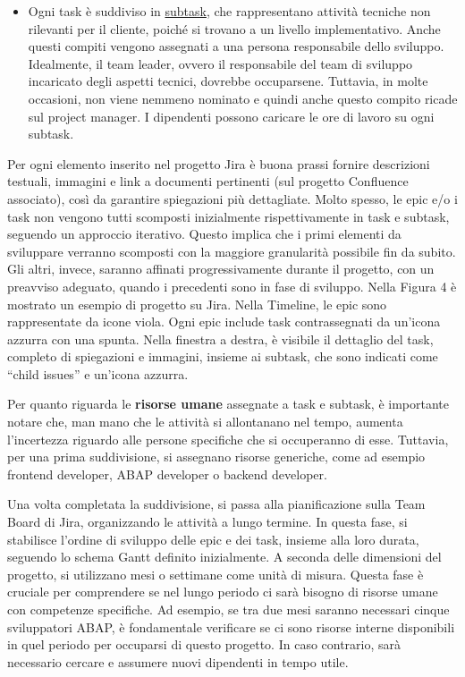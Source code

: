 \begin{itemize}
            \item Ogni task è suddiviso in \underline{subtask}, che rappresentano attività tecniche non rilevanti per il cliente, poiché si trovano a un livello
            implementativo. Anche questi compiti vengono assegnati a una persona responsabile dello sviluppo. Idealmente, il team leader, ovvero il
            responsabile del team di sviluppo incaricato degli aspetti tecnici, dovrebbe occuparsene. Tuttavia, in molte occasioni, non viene nemmeno
            nominato e quindi anche questo compito ricade sul project manager. I dipendenti possono caricare le ore di lavoro su ogni subtask.
        \end{itemize}

        Per ogni elemento inserito nel progetto Jira è buona prassi fornire descrizioni testuali, immagini e link a documenti pertinenti
        (sul progetto Confluence associato), così da garantire spiegazioni più dettagliate.
        Molto spesso, le epic e/o i task non vengono tutti scomposti inizialmente rispettivamente in task e subtask, seguendo un approccio iterativo.
        Questo implica che i primi elementi da sviluppare verranno scomposti con la maggiore granularità possibile fin da subito. Gli altri, invece,
        saranno affinati progressivamente durante il progetto, con un preavviso adeguato, quando i precedenti sono in fase di sviluppo.
        Nella Figura 4 è mostrato un esempio di progetto su Jira. Nella Timeline, le epic sono rappresentate da icone viola. Ogni epic include task
        contrassegnati da un'icona azzurra con una spunta. Nella finestra a destra, è visibile il dettaglio del task, completo di spiegazioni e immagini,
        insieme ai subtask, che sono indicati come “child issues” e un'icona azzurra.
        

        Per quanto riguarda le \textbf{risorse umane} assegnate a task e subtask, è importante notare che, man mano che le attività si allontanano nel tempo,
        aumenta l'incertezza riguardo alle persone specifiche che si occuperanno di esse. Tuttavia, per una prima suddivisione, si assegnano risorse
        generiche, come ad esempio frontend developer, ABAP developer o backend developer.
        
        Una volta completata la suddivisione, si passa alla pianificazione sulla Team Board di Jira, organizzando le attività a lungo termine.
        In questa fase, si stabilisce l'ordine di sviluppo delle epic e dei task, insieme alla loro durata, seguendo lo schema Gantt definito inizialmente.
        A seconda delle dimensioni del progetto, si utilizzano mesi o settimane come unità di misura. Questa fase è cruciale per comprendere se nel lungo
        periodo ci sarà bisogno di risorse umane con competenze specifiche. Ad esempio, se tra due mesi saranno necessari cinque sviluppatori ABAP,
        è fondamentale verificare se ci sono risorse interne disponibili in quel periodo per occuparsi di questo progetto. In caso contrario, sarà necessario cercare e assumere nuovi dipendenti in tempo utile.

